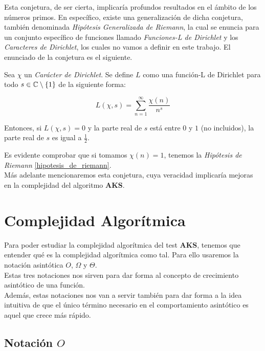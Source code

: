 Esta conjetura, de ser cierta, implicaría profundos resultados en el ámbito de los números primos. En específico, existe una generalización de dicha conjetura, también denominada \textit{Hipótesis Generalizada de Riemann}, la cual se enuncia para un conjunto específico de funciones llamado \textit{Funciones-L de Dirichlet} y los \textit{Caracteres de Dirichlet}, los cuales no vamos a definir en este trabajo. El enunciado de la conjetura es el siguiente.

\begin{conjetura}\label{hipotesis_generalizada_de_riemann}
	Sea $\chi$ un \textit{Carácter de Dirichlet}. Se define $L$ como una función-L de Dirichlet para todo $s \in \mathbb{C} \setminus \{1\}$ de la siguiente forma:
	
	\begin{equation}
	L(\chi, s) = \sum_{n=1}^{\infty}\frac{\chi(n)}{n^s}
	\end{equation}
	
	Entonces, si $L(\chi, s) = 0$ y la parte real de $s$ está entre $0$ y $1$ (no incluidos), la parte real de $s$ es igual a $\frac{1}{2}$.
\end{conjetura}

Es evidente comprobar que si tomamos $\chi(n) = 1$, tenemos la \textit{Hipótesis de Riemann} \ref{hipotesis_de_riemann}.\\

Más adelante mencionaremos esta conjetura, cuya veracidad implicaría mejoras en la complejidad del algoritmo \textbf{AKS}.

\section{Complejidad Algorítmica}

Para poder estudiar la complejidad algorítmica del test \textbf{AKS}, tenemos que entender qué es la complejidad algorítmica como tal. Para ello usaremos la notación asintótica $O$, $\Omega$ y $\Theta$.\\

Estas tres notaciones nos sirven para dar forma al concepto de crecimiento asintótico de una función.\\

Además, estas notaciones nos van a servir también para dar forma a la idea intuitiva de que el único término necesario en el comportamiento asintótico es aquel que crece más rápido.

\subsection{Notación $O$}

